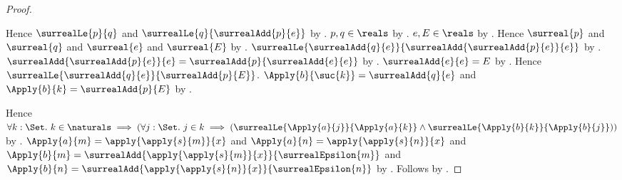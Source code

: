 \begin{proof}
\begin{subproof}
        Hence $\surrealLe{p}{q}$ and
            $\surrealLe{q}{\surrealAdd{p}{e}}$
            by .
        $p,q\in\reals$ by \auto.
        $e,E\in\reals$ by .
        Hence $\surreal{p}$ and $\surreal{q}$ and $\surreal{e}$ and
            $\surreal{E}$ by .
        $\surrealLe{\surrealAdd{q}{e}}
            {\surrealAdd{\surrealAdd{p}{e}}{e}}$
            by .
        $\surrealAdd{\surrealAdd{p}{e}}{e}
            =\surrealAdd{p}{\surrealAdd{e}{e}}$
            by .
        $\surrealAdd{e}{e}=E$
            by .
        Hence $\surrealLe{\surrealAdd{q}{e}}{\surrealAdd{p}{E}}$.
        $\Apply{b}{\suc{k}}=\surrealAdd{q}{e}$ and
            $\Apply{b}{k}=\surrealAdd{p}{E}$
            by \auto.
    \end{subproof}
    Hence $\forall k:\Set.\ k\in\naturals\implies
        (\forall j:\Set.\ j\in k\implies
            (\surrealLe{\Apply{a}{j}}{\Apply{a}{k}}\land
             \surrealLe{\Apply{b}{k}}{\Apply{b}{j}}))$
        by .
    $\Apply{a}{m}=\apply{\apply{s}{m}}{x}$ and
        $\Apply{a}{n}=\apply{\apply{s}{n}}{x}$ and
        $\Apply{b}{m}=\surrealAdd{\apply{\apply{s}{m}}{x}}
            {\surrealEpsilon{m}}$ and
        $\Apply{b}{n}=\surrealAdd{\apply{\apply{s}{n}}{x}}
            {\surrealEpsilon{n}}$
        by \auto.
    Follows by \auto.
\end{proof}

